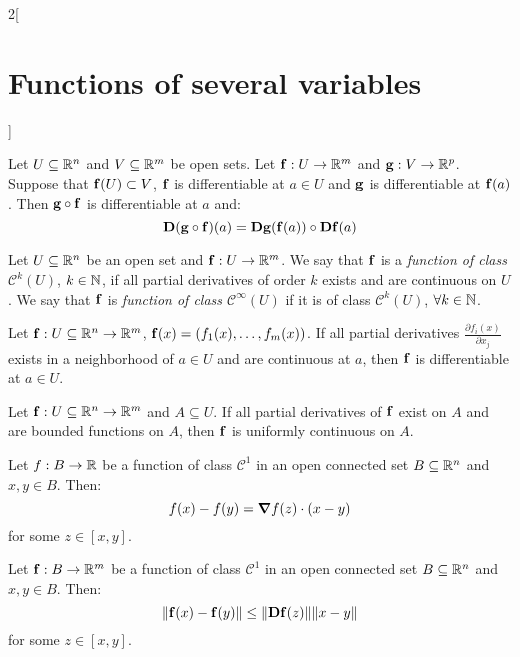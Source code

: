 \documentclass[../../../main.tex]{subfiles}
\begin{document}
\begin{multicols}{2}[\section{Functions of several variables}]
\begin{theorem}
    Let $U\subseteq\mathbb{R}^n$ and $V\subseteq\mathbb{R}^m$ be open sets. Let $\boldsymbol{\mathrm{f}}:U\rightarrow\mathbb{R}^m$ and $\boldsymbol{\mathrm{g}}:V\rightarrow\mathbb{R}^p$. Suppose that $\boldsymbol{\mathrm{f}}(U)\subset V$, $\boldsymbol{\mathrm{f}}$ is differentiable at $a\in U$ and $\boldsymbol{\mathrm{g}}$ is differentiable at $\boldsymbol{\mathrm{f}}(a)$. Then $\boldsymbol{\mathrm{g}}\circ \boldsymbol{\mathrm{f}}$ is differentiable at $a$ and: $$\boldsymbol{\mathrm{D}}(\boldsymbol{\mathrm{g}}\circ \boldsymbol{\mathrm{f}})(a)=\boldsymbol{\mathrm{Dg}}(\boldsymbol{\mathrm{f}}(a))\circ \boldsymbol{\mathrm{Df}}(a)$$
  \end{theorem}
  \begin{definition}
    Let $U\subseteq\mathbb{R}^n$ be an open set and $\boldsymbol{\mathrm{f}}:U\rightarrow\mathbb{R}^m$. We say that $\boldsymbol{\mathrm{f}}$ is a \textit{function of class $\mathcal{C}^k(U)$}, $k\in\mathbb{N} $, if all partial derivatives of order $k$ exists and are continuous on $U$. We say that $\boldsymbol{\mathrm{f}}$ is \textit{function of class $\mathcal{C}^\infty(U)$} if it is of class $\mathcal{C}^k(U)$, $\forall k\in\mathbb{N} $.
  \end{definition}
  \begin{theorem}
    Let $\boldsymbol{\mathrm{f}}:U\subseteq\mathbb{R}^n\rightarrow\mathbb{R}^m$, $\boldsymbol{\mathrm{f}}(x)=(f_1(x),\ldots,f_m(x))$. If all partial derivatives $\displaystyle \frac{\partial f_i(x)}{\partial x_j}$ exists in a neighborhood of $a\in U$ and are continuous at $a$, then $\boldsymbol{\mathrm{f}}$ is differentiable at $a\in U$.
  \end{theorem}
  \begin{prop}
    Let $\boldsymbol{\mathrm{f}}:U\subseteq\mathbb{R}^n\rightarrow\mathbb{R}^m$ and $A\subseteq U$. If all partial derivatives of $\boldsymbol{\mathrm{f}}$ exist on $A$ and are bounded functions on $A$, then $\boldsymbol{\mathrm{f}}$ is uniformly continuous on $A$.
  \end{prop}
  \begin{theorem}
    Let $f:B\rightarrow\mathbb{R} $ be a function of class $\mathcal{C}^1$ in an open connected set $B\subseteq\mathbb{R}^n$ and $x,y\in B$. Then: $$f(x)-f(y)=\grad f(z)\cdot(x-y)$$ for some $z\in[x,y]$.
  \end{theorem}
  \begin{theorem}
    Let $\boldsymbol{\mathrm{f}}:B\rightarrow\mathbb{R}^m$ be a function of class $\mathcal{C}^1$ in an open connected set $B\subseteq\mathbb{R}^n$ and $x,y\in B$. Then: $$\|\boldsymbol{\mathrm{f}}(x)-\boldsymbol{\mathrm{f}}(y)\|\leq\|\boldsymbol{\mathrm{Df}}(z)\|\|x-y\|$$ for some $z\in[x,y]$.
  \end{theorem}

\end{multicols}
\end{document}
